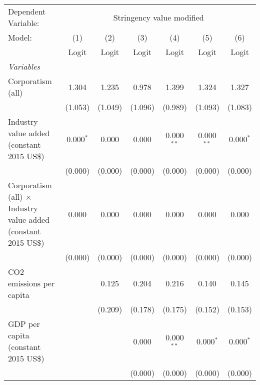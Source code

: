 
\begingroup
\centering
\begin{tabular}{lcccccc}
   \toprule
   Dependent Variable: & \multicolumn{6}{c}{Stringency value modified}\\
   Model:                                                                 & (1)         & (2)     & (3)     & (4)           & (5)          & (6)\\  
                                                                          &  Logit      & Logit   & Logit   & Logit         & Logit        & Logit\\  
   \midrule
   \emph{Variables}\\
   Corporatism (all)                                                      & 1.304       & 1.235   & 0.978   & 1.399         & 1.324        & 1.327\\   
                                                                          & (1.053)     & (1.049) & (1.096) & (0.989)       & (1.093)      & (1.083)\\   
   Industry value added (constant 2015 US\$)                              & 0.000$^{*}$ & 0.000   & 0.000   & 0.000$^{**}$  & 0.000$^{**}$ & 0.000$^{*}$\\   
                                                                          & (0.000)     & (0.000) & (0.000) & (0.000)       & (0.000)      & (0.000)\\   
   Corporatism (all) $\times$ Industry value added (constant 2015 US\$)   & 0.000       & 0.000   & 0.000   & 0.000         & 0.000        & 0.000\\   
                                                                          & (0.000)     & (0.000) & (0.000) & (0.000)       & (0.000)      & (0.000)\\   
   CO2 emissions per capita                                               &             & 0.125   & 0.204   & 0.216         & 0.140        & 0.145\\   
                                                                          &             & (0.209) & (0.178) & (0.175)       & (0.152)      & (0.153)\\   
   GDP per capita (constant 2015 US\$)                                    &             &         & 0.000   & 0.000$^{**}$  & 0.000$^{*}$  & 0.000$^{*}$\\   
                                                                          &             &         & (0.000) & (0.000)       & (0.000)      & (0.000)\\   

\end{tabular}
